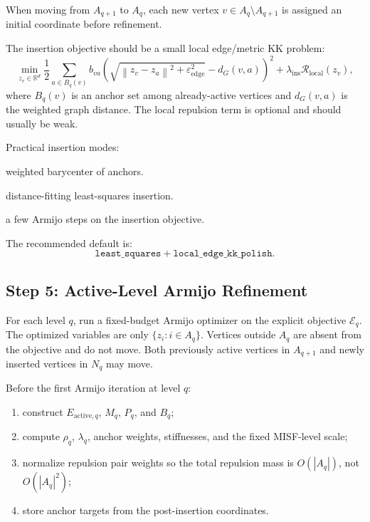 \documentclass[11pt]{article}
\newcommand{\RR}{\mathbb{R}}
\newcommand{\norm}[1]{\left\lVert #1 \right\rVert}
\newcommand{\eps}{\varepsilon}
\begin{document}
When moving from \(A_{q+1}\) to \(A_q\), each new vertex \(v\in A_q\setminus
A_{q+1}\) is assigned an initial coordinate before refinement.

The insertion objective should be a small local edge/metric KK problem:
\[
  \min_{z_v\in\RR^d}
  \frac{1}{2}
  \sum_{a\in B_q(v)}
  b_{va}
  \left(
    \sqrt{\norm{z_v-z_a}^2+\eps_{\mathrm{edge}}^2}
    -
    d_G(v,a)
  \right)^2
  +
  \lambda_{\mathrm{ins}}
  \mathcal{R}_{\mathrm{local}}(z_v),
\]
where \(B_q(v)\) is an anchor set among already-active vertices and
\(d_G(v,a)\) is the weighted graph distance. The local repulsion term is
optional and should usually be weak.

Practical insertion modes:
\begin{description}[leftmargin=2em]
  \item[\texttt{barycenter}] weighted barycenter of anchors.
  \item[\texttt{least\_squares}] distance-fitting least-squares insertion.
  \item[\texttt{local\_edge\_kk}] a few Armijo steps on the insertion objective.
\end{description}

The recommended default is:
\[
  \texttt{least\_squares} + \texttt{local\_edge\_kk\_polish}.
\]

\subsection{Step 5: Active-Level Armijo Refinement}

For each level \(q\), run a fixed-budget Armijo optimizer on the explicit
objective \(\mathcal{E}_q\). The optimized variables are only
\(\{z_i:i\in A_q\}\). Vertices outside \(A_q\) are absent from the objective and
do not move. Both previously active vertices in \(A_{q+1}\) and newly inserted
vertices in \(N_q\) may move.

Before the first Armijo iteration at level \(q\):
\begin{enumerate}[leftmargin=2em]
  \item construct \(E_{\mathrm{active},q}\), \(M_q\), \(P_q\), and \(B_q\);
  \item compute \(\rho_q\), \(\lambda_q\), anchor weights, stiffnesses, and the
  fixed MISF-level scale;
  \item normalize repulsion pair weights so the total repulsion mass is
  \(O(|A_q|)\), not \(O(|A_q|^2)\);
  \item store anchor targets from the post-insertion coordinates.
\end{enumerate}
\end{document}
